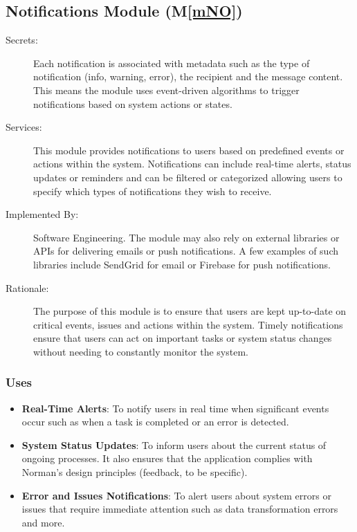 \documentclass[12pt, titlepage]{article}
\newcommand{\mref}[1]{M\ref{#1}}
\begin{document}
\begin{description}
\subsection{Notifications Module (\mref{mNO})}
\begin{description}
  \item[Secrets:] Each notification is associated with metadata such as the type of notification 
  (info, warning, error), the recipient and the message content. This means the module uses 
  event-driven algorithms to trigger notifications based on system actions or states. 
  \item[Services:] This module provides notifications to users based on predefined events or actions 
  within the system. Notifications can include real-time alerts, status updates or reminders and 
  can be filtered or categorized allowing users to specify which types of notifications they 
  wish to receive.
  \item[Implemented By:] Software Engineering. The module may also rely on external libraries or APIs 
  for delivering emails or push notifications. A few examples of such libraries include SendGrid for email 
  or Firebase for push notifications.
  \item[Rationale:] The purpose of this module is to ensure that users are kept up-to-date on critical 
  events, issues and actions within the system. Timely notifications ensure that users can act on 
  important tasks or system status changes without needing to constantly monitor the system.
\end{description}

\subsubsection{Uses}
\begin{itemize}
  \item \textbf{Real-Time Alerts}: To notify users in real time when significant events occur such as 
  when a task is completed or an error is detected.
  \item \textbf{System Status Updates}: To inform users about the current status of ongoing processes. It 
  also ensures that the application complies with Norman's design principles (feedback, to be specific).
  \item \textbf{Error and Issues Notifications}: To alert users about system errors or issues that require 
  immediate attention such as data transformation errors and more.
\end{itemize}


\end{description}
\end{document}
